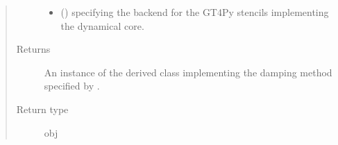 \documentclass[letterpaper,10pt,english]{sphinxmanual}
\begin{document}
\begin{fulllineitems}
\begin{fulllineitems}
\begin{quote}
\begin{description}
\begin{itemize}
\item {} 
 () \textendash{}  specifying the backend for the GT4Py stencils implementing the dynamical core.

\end{itemize}

\item[{Returns}] \leavevmode
An instance of the derived class implementing the damping method specified by .

\item[{Return type}] \leavevmode
obj

\end{description}\end{quote}

\end{fulllineitems}


\end{fulllineitems}

\end{document}

